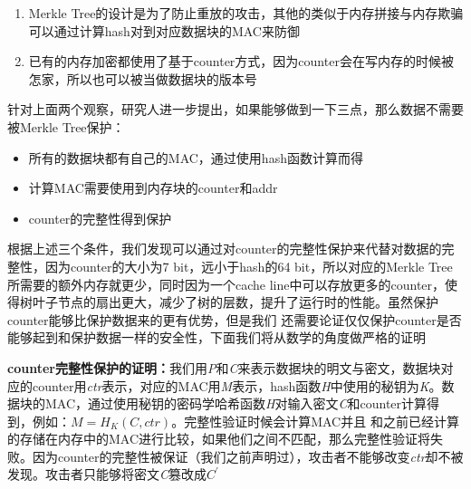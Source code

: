 \begin{enumerate}
    \item Merkle Tree的设计是为了防止重放的攻击，其他的类似于内存拼接与内存欺骗可以通过计算hash对到对应数据块的MAC来防御
    \item 已有的内存加密都使用了基于counter方式，因为counter会在写内存的时候被怎家，所以也可以被当做数据块的版本号
\end{enumerate}
针对上面两个观察，研究人进一步提出，如果能够做到一下三点，那么数据不需要被Merkle Tree保护：
\begin{itemize}
    \item 所有的数据块都有自己的MAC，通过使用hash函数计算而得
    \item 计算MAC需要使用到内存块的counter和addr
    \item counter的完整性得到保护
\end{itemize}
根据上述三个条件，我们发现可以通过对counter的完整性保护来代替对数据的完整性，因为counter的大小为7 bit，远小于hash的64 bit，所以对应的Merkle Tree所需要的额外内存就更少，同时因为一个cache line中可以存放更多的counter，使得树叶子节点的扇出更大，减少了树的层数，提升了运行时的性能。虽然保护counter能够比保护数据来的更有优势，但是我们
还需要论证仅仅保护counter是否能够起到和保护数据一样的安全性，下面我们将从数学的角度做严格的证明

\textbf{counter完整性保护的证明：}我们用\emph{P}和\emph{C}来表示数据块的明文与密文，数据块对应的counter用\emph{ctr}表示，对应的MAC用\emph{M}表示，hash函数\emph{H}中使用的秘钥为\emph{K}。数据块的MAC，通过使用秘钥的密码学哈希函数\emph{H}对输入密文\emph{C}和counter计算得到，例如：$M = H_K(C, ctr)$。完整性验证时候会计算MAC并且
和之前已经计算的存储在内存中的MAC进行比较，如果他们之间不匹配，那么完整性验证将失败。因为counter的完整性被保证（我们之前声明过），攻击者不能够改变\emph{ctr}却不被发现。攻击者只能够将密文\emph{C}篡改成$C^{\prime}$